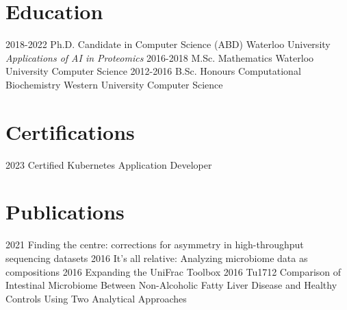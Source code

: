 \documentclass[]{twentysecondcv}
\begin{document}
\section{Education}

\begin{twenty}
  \twentyitem
    {2018-2022}
    {Ph.D. {\normalfont Candidate in Computer Science} (ABD)}
    {Waterloo University}
    {\emph{Applications of AI in Proteomics}}
  \twentyitem
    {2016-2018}
    {M.Sc. Mathematics}
    {Waterloo University}
    {Computer Science}
  \twentyitem
    {2012-2016}
    {B.Sc. Honours Computational Biochemistry}
    {Western University}
    {Computer Science}
\end{twenty}


\section{Certifications}

\begin{twentyshort}
  \twentyitemshort
    {2023}
    {Certified Kubernetes Application Developer}
\end{twentyshort}


\section{Publications}

\begin{twentyshort}
  \twentyitemshort
    {2021}
    {Finding the centre: corrections for asymmetry in high-throughput sequencing datasets}
  \twentyitemshort
    {2016}
    {It's all relative: Analyzing microbiome data as compositions}
  \twentyitemshort
    {2016}
    {Expanding the UniFrac Toolbox}
  \twentyitemshort
    {2016}
    {Tu1712 Comparison of Intestinal Microbiome Between Non-Alcoholic Fatty Liver Disease and Healthy Controls Using Two Analytical Approaches}
\end{twentyshort}

\end{document}
